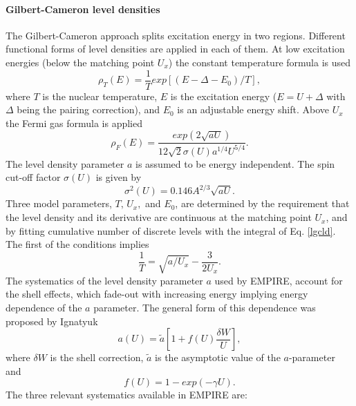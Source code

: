 \documentclass[twocolumn,amsmath,amssymb,10pt,groupedaddress,letter]{revtex4}
\begin{document}
\paragraph{Gilbert-Cameron level densities}
The Gilbert-Cameron approach \cite{gc} splits excitation energy in
two regions. Different functional forms of level densities
are applied in each of them. At low excitation energies (below the
matching point $U_{x}$) the constant temperature formula is used
\begin{equation}
\rho_{T}(E)=\frac{1}{T}exp\left[(E-\Delta-E_{0})/T\right],
\label{lgcld}
\end{equation}
\noindent where $T$ is the nuclear temperature, $E$ is the excitation energy
($E=U+\Delta$ with $\Delta$ being the pairing correction), and $E_{0}$
is an adjustable energy shift. Above $U_{x}$ the Fermi gas formula
is applied
\begin{equation}
\rho_{F}(E)=\frac{exp(2\sqrt{aU})}{12\sqrt{2}\sigma(U)a^{1/4}U^{5/4}}.
\label{ferld}
\end{equation}
The level density parameter $a$ is assumed to be energy independent.
The spin cut-off factor $\sigma(U)$ is given by
\begin{equation}
\sigma^{2}(U)=0.146A^{2/3}\sqrt{aU}.
\label{sigld}
\end{equation}
Three model parameters, $T,\, U_{x},$ and $E_{0}$, are determined
by the requirement that the level density and its derivative are continuous
at the matching point $U_{x}$, and by fitting cumulative number of
discrete levels with the integral of Eq. \ref{lgcld}. The first of
the conditions implies
\begin{equation}
\frac{1}{T}=\sqrt{a/U_{x}}-\frac{3}{2U_{x}}.
\label{condUT}
\end{equation}
The systematics of the level density parameter $a$ used by EMPIRE,
account for the shell effects, which fade-out
with increasing energy implying energy dependence of the $a$ parameter.
The general form of this dependence was proposed by Ignatyuk~\cite{ignaa}
\begin{equation}
a(U)=\widetilde{a}[1+f(U)\frac{\delta W}{U}],
\label{apiccoloGC}
\end{equation}
\noindent where $\delta W$ is the shell correction, $\widetilde{a}$ is the
asymptotic value of the $a$-parameter and
\begin{equation}
f(U)=1-exp(-\gamma U).
\label{shellGC}
\end{equation}
The three relevant systematics available in EMPIRE are:
\end{document}
